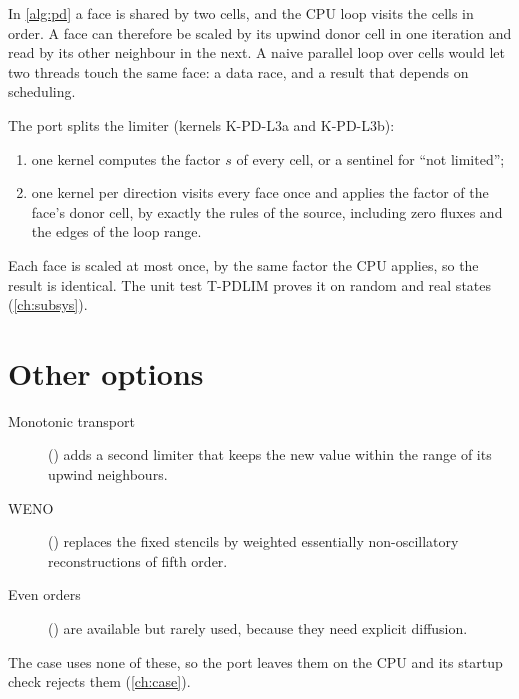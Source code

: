\begin{portnote}
In \cref{alg:pd} a face is shared by two cells, and the CPU loop visits the cells in order. A face can therefore be
scaled by its upwind donor cell in one iteration and read by its other neighbour in the next. A naive parallel loop
over cells would let two threads touch the same face: a data race, and a result that depends on scheduling.

The port splits the limiter (kernels K-PD-L3a and K-PD-L3b):
\begin{enumerate}
  \item one kernel computes the factor $s$ of every cell, or a sentinel for ``not limited'';
  \item one kernel per direction visits every face once and applies the factor of the face's donor cell, by exactly
    the rules of the source, including zero fluxes and the edges of the loop range.
\end{enumerate}
Each face is scaled at most once, by the same factor the CPU applies, so the result is identical. The unit test
T-PDLIM proves it on random and real states (\cref{ch:subsys}).
\end{portnote}

\section{Other options}

\begin{description}
  \item[Monotonic transport] () adds a second limiter that keeps the new value within the
    range of its upwind neighbours.
  \item[WENO] () replaces the fixed stencils by weighted essentially non-oscillatory
    reconstructions of fifth order.
  \item[Even orders] () are available but rarely used, because they need explicit
    diffusion.
\end{description}
The case uses none of these, so the port leaves them on the CPU and its startup check rejects them (\cref{ch:case}).
